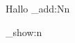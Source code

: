 \documentclass{article}
\begin{document}
Hallo
\ExplSyntaxOn
\dim_add:Nn \gdtmp { 10pt + 5pt }

\dim_show:n { \gdtmp }
\ExplSyntaxOff
\end{document}
